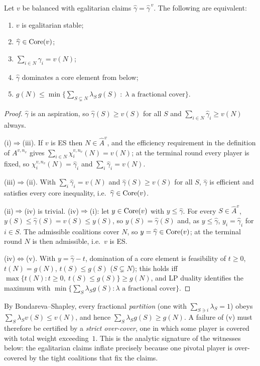\begin{lemma}\label{lem:esiff}
Let $v$ be balanced with egalitarian claims $\widehat\gamma=\widehat\gamma^{\,v}$.
The following are equivalent:
\begin{enumerate}[label=\textup{(\roman*)},leftmargin=2.4em]
\item $v$ is egalitarian stable;
\item $\widehat\gamma\in\operatorname{Core}(v)$;
\item $\sum_{i\in N}\widehat\gamma_i=v(N)$;
\item $\widehat\gamma$ dominates a core element from below;
\item $g(N)\le\min\bigl\{\sum_{S\subsetneq N}\lambda_S\,g(S)\;:\;\lambda
      \text{ a fractional cover}\bigr\}$.
\end{enumerate}
\end{lemma}

\begin{proof}
$\widehat\gamma$ is an aspiration, so $\widehat\gamma(S)\ge v(S)$ for all $S$ and
$\sum_{i\in N}\widehat\gamma_i\ge v(N)$ always.

(i)$\Rightarrow$(iii). If $v$ is ES then $N\in\widehat A^{v}$, and the efficiency
requirement in the definition of $A^{v,n_v}$ gives
$\sum_{i\in N}\chi^{v,n_v}_i(N)=v(N)$; at the terminal round every player is
fixed, so $\chi^{v,n_v}_i(N)=\widehat\gamma_i$ and $\sum_i\widehat\gamma_i=v(N)$.

(iii)$\Rightarrow$(ii). With $\sum_i\widehat\gamma_i=v(N)$ and
$\widehat\gamma(S)\ge v(S)$ for all $S$, $\widehat\gamma$ is efficient and
satisfies every core inequality, i.e.\ $\widehat\gamma\in\operatorname{Core}(v)$.

(ii)$\Rightarrow$(iv) is trivial. (iv)$\Rightarrow$(i): let $y\in\operatorname{Core}(v)$ with
$y\le\widehat\gamma$. For every $S\in\widehat A^{v}$,
$y(S)\le\widehat\gamma(S)=v(S)\le y(S)$, so $y(S)=\widehat\gamma(S)$ and, as
$y\le\widehat\gamma$, $y_i=\widehat\gamma_i$ for $i\in S$. The admissible
coalitions cover $N$, so $y=\widehat\gamma\in\operatorname{Core}(v)$; at the terminal round
$N$ is then admissible, i.e.\ $v$ is ES.

(iv)$\Leftrightarrow$(v). With $y=\widehat\gamma-t$, domination of a core element
is feasibility of $t\ge0$, $t(N)=g(N)$, $t(S)\le g(S)$ ($S\subsetneq N$); this
holds iff $\max\{t(N):t\ge0,\ t(S)\le g(S)\}\ge g(N)$, and LP duality identifies
the maximum with $\min\{\sum_S\lambda_S g(S):\lambda\text{ a fractional cover}\}$.
\end{proof}

\begin{remark}\label{rem:overcover}
By Bondareva--Shapley, every fractional \emph{partition} (one with
$\sum_{S\ni i}\lambda_S=1$) obeys $\sum_S\lambda_S v(S)\le v(N)$, and hence
$\sum_S\lambda_S g(S)\ge g(N)$. A failure of \textup{(v)} must therefore be
certified by a \emph{strict over-cover}, one in which some player is covered with
total weight exceeding~$1$. This is the analytic signature of the witnesses
below: the egalitarian claims inflate precisely because one pivotal player is
over-covered by the tight coalitions that fix the claims.
\end{remark}


